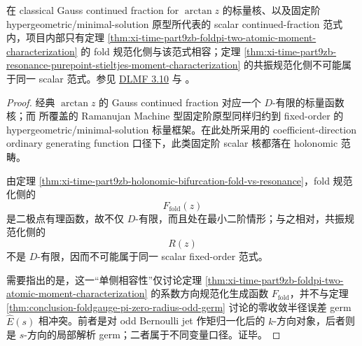 \begin{corollary}\label{cor:xi-time-part9zb-fixed-order-scalar-cf-one-sided-compatibility}
在 classical Gauss continued fraction for \(\arctan z\) 的标量核、以及固定阶 hypergeometric/minimal-solution 原型所代表的 scalar continued-fraction 范式内，项目内部只有定理 \ref{thm:xi-time-part9zb-foldpi-two-atomic-moment-characterization} 的 fold 规范化侧与该范式相容；定理 \ref{thm:xi-time-part9zb-resonance-purepoint-stieltjes-moment-characterization} 的共振规范化侧不可能属于同一 scalar 范式。参见 \href{https://dlmf.nist.gov/3.10?utm_source=chatgpt.com}{DLMF 3.10} 与 \cite{Wang2026RamanujanMachinePi}。
\end{corollary}
\begin{proof}
经典 \(\arctan z\) 的 Gauss continued fraction 对应一个 \(D\)-有限的标量函数核；而 \cite{Wang2026RamanujanMachinePi} 所覆盖的 Ramanujan Machine 型固定阶原型同样归约到 fixed-order 的 hypergeometric/minimal-solution 标量框架。在此处所采用的 coefficient-direction ordinary generating function 口径下，此类固定阶 scalar 核都落在 holonomic 范畴。

由定理 \ref{thm:xi-time-part9zb-holonomic-bifurcation-fold-vs-resonance}，fold 规范化侧的
\[
F_{\mathrm{fold}}(z)
\]
是二极点有理函数，故不仅 \(D\)-有限，而且处在最小二阶情形；与之相对，共振规范化侧的
\[
R(z)
\]
不是 \(D\)-有限，因而不可能属于同一 scalar fixed-order 范式。

需要指出的是，这一“单侧相容性”仅讨论定理 \ref{thm:xi-time-part9zb-foldpi-two-atomic-moment-characterization} 的系数方向规范化生成函数 \(F_{\mathrm{fold}}\)，并不与定理 \ref{thm:conclusion-foldgauge-pi-zero-radius-odd-germ} 讨论的零收敛半径误差 germ \(\widehat E(s)\) 相冲突。前者是对 odd Bernoulli jet 作矩归一化后的 \(k\)-方向对象，后者则是 \(s\)-方向的局部解析 germ；二者属于不同变量口径。证毕。
\end{proof}

